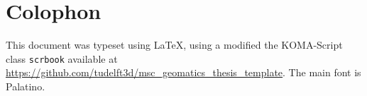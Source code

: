 \thispagestyle{empty}

\hfill{}
\vfill{}

\section*{Colophon}
\noindent This document was typeset using \LaTeX, using a modified the KOMA-Script class \texttt{scrbook} available at \url{https://github.com/tudelft3d/msc_geomatics_thesis_template}. 
The main font is Palatino.
